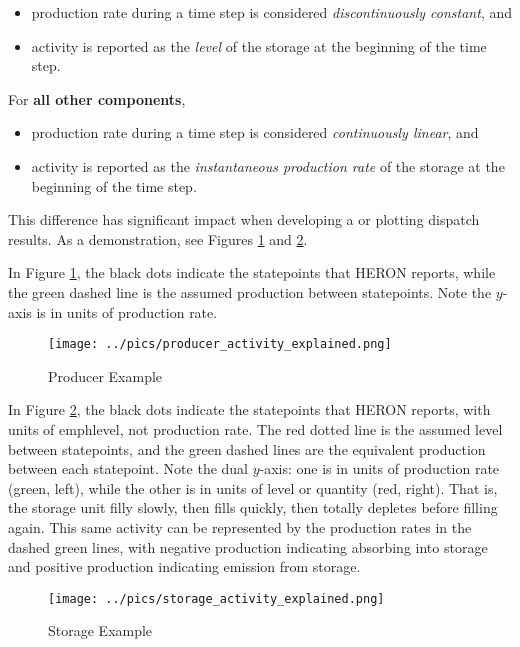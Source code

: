 \begin{itemize}
  \item production rate during a time step is considered \emph{discontinuously constant}, and
  \item activity is reported as the \emph{level} of the storage at the beginning of the time step.
\end{itemize}
For \textbf{all other components},
\begin{itemize}
  \item production rate during a time step is considered \emph{continuously linear}, and
  \item activity is reported as the \emph{instantaneous production rate} of the storage at the
        beginning of the time step.
\end{itemize}
This difference has significant impact when developing a  or plotting dispatch
results. As a demonstration, see Figures \ref{fig:producer_example} and \ref{fig:storage_example}.

In Figure \ref{fig:producer_example}, the black dots indicate the statepoints that HERON reports,
while the green dashed line is the assumed production between statepoints. Note the
$y$-axis is in units of production rate.

\begin{figure}[h!]
  \centering
  \texttt{[image: ../pics/producer\_activity\_explained.png]}
  \caption{Producer Example}
  \label{fig:producer_example}
\end{figure}

In Figure \ref{fig:storage_example}, the black dots indicate the statepoints that HERON reports,
with units of emph{level}, not production rate. The red dotted line is the assumed level between
statepoints, and the green dashed lines are the equivalent production between each statepoint.
Note the dual $y$-axis: one is in units of production rate (green, left), while the other is in units of level or
quantity (red, right). That is, the storage unit filly slowly, then fills quickly, then totally depletes before
filling again. This same activity can be represented by the production rates in the dashed green
lines, with negative production indicating absorbing into storage and positive production indicating
emission from storage.
\begin{figure}[h!]
  \centering
  \texttt{[image: ../pics/storage\_activity\_explained.png]}
  \caption{Storage Example}
  \label{fig:storage_example}
\end{figure}

